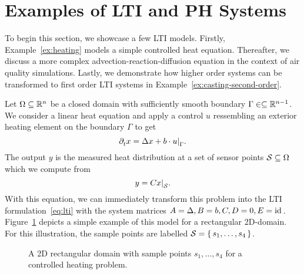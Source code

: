 \section{Examples of \texorpdfstring{\ac{LTI}}{LTI} and \texorpdfstring{\ac{PH}}{PH} Systems}

To begin this section, we showcase a few \ac{LTI} models.
Firstly, Example~\ref{ex:heating} models a simple controlled heat equation.
Thereafter, we discuss a more complex advection-reaction-diffusion equation in the context of air quality simulations.
Lastly, we demonstrate how higher order systems can be transformed to first order \ac{LTI} systems in Example~\ref{ex:casting-second-order}.

\begin{example}\label{ex:heating}
    Let $\Omega \subseteq \mathbb{R}^n$ be a closed domain with sufficiently smooth boundary $\Gamma \in \subseteq \mathbb{R}^{n - 1}$.
    We consider a linear heat equation and apply a control $u$ ressembling an exterior heating element on the boundary $\Gamma$ to get
    \begin{equation*}
        \pd[t]{} x = \lapl{x} + b \cdot \res{u}{\Gamma}.
    \end{equation*}
    The output $y$ is the measured heat distribution at a set of sensor points $\mathcal{S} \subseteq \Omega$ which we compute from
    \begin{equation*}
        y = C \res{x}{\mcl{S}}.
    \end{equation*}
    With this equation, we can immediately transform this problem into the \ac{LTI} formulation~\eqref{eq:lti} with the system matrices $A = \mathop{}\!\Delta{}, B = b, C, D = 0, E = \text{id}_{\mkern2mu }$.
    Figure~\ref{fig:lti-heating} depicts a simple example of this model for a rectangular 2D-domain.
    For this illustration, the sample points are labelled $\mathcal{S} = \left\{\,s_1, \dots, s_4\,\right\}$.

    \begin{figure}[h]
        \centering
        \caption{A 2D rectangular domain with sample points $s_1, \dots, s_4$ for a controlled heating problem.}%
        \label{fig:lti-heating}
    \end{figure}
\end{example}

